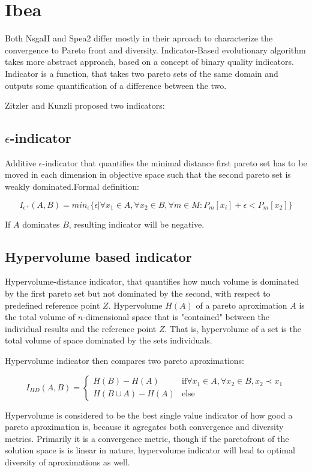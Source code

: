 \documentclass[12pt,oneside]{fithesis2}
\begin{document}
\section{Ibea}
Both NsgaII and Spea2 differ mostly in their aproach to characterize the convergence to Pareto front and diversity. 
Indicator-Based evolutionary algorithm takes more abstract approach, based on a concept of binary quality indicators.
Indicator is a function, that takes two pareto sets of the same domain and outputs some quantification of a difference between the two.

Zitzler and Kunzli proposed two indicators:


\subsection{$\epsilon$-indicator}   
Additive $\epsilon$-indicator that quantifies the minimal distance first pareto set has to be moved in each dimension in objective space such that the second pareto set is weakly dominated.Formal definition:

$$I_{\epsilon^+}(A,B) = min_\epsilon\{\epsilon |\forall x_1 \in A, \forall x_2 \in B, \forall m \in M: P_m[x_i] + \epsilon < P_m[x_2] \} $$

If $A$ dominates $B$, resulting indicator will be negative.

\subsection{Hypervolume based indicator}   
Hypervolume-distance indicator, that quantifies how much volume is dominated by the first pareto set but not dominated by the second, with respect to predefined reference point $Z$. 
Hypervolume $H(A)$ of a pareto aproximation $A$ is the total volume of $n$-dimensional space that is "contained" between the individual results and the reference point $Z$. That is, hypervolume of a set is the total volume of space dominated by the sets individuals.

Hypervolume indicator then compares two pareto aproximations:

$$I_{HD}(A,B) = 
\begin{cases} 
    H(B) - H(A) & \text{if} \forall x_1 \in A, \forall x_2 \in B, x_2 \prec x_1 \\
    H(B \cup A) - H(A) & \text{else}
\end{cases}$$

Hypervolume is considered to be the best single value indicator of how good a pareto aproximation is, because it agregates both convergence and diversity metrics. Primarily it is a convergence metric, though if the paretofront of the solution space is is linear in nature, hypervolume indicator will lead to optimal diversity of aproximations as well. \cite{auger2009theory} 
\end{document}
